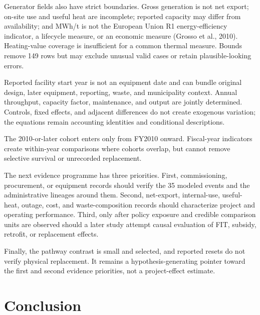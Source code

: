 \documentclass[12pt,letterpaper]{article}
\begin{document}
Generator fields also have strict boundaries. Gross generation is not net
export; on-site use and useful heat are incomplete; reported capacity may differ
from availability; and MWh/t is not the European Union R1 energy-efficiency
indicator, a lifecycle measure, or an economic measure (Grosso et al., 2010).
Heating-value coverage is insufficient for a common thermal measure. Bounds
remove 149 rows but may exclude unusual valid cases or retain plausible-looking
errors.

Reported facility start year is not an equipment date and can bundle original
design, later equipment, reporting, waste, and municipality context. Annual throughput,
capacity factor, maintenance, and output are jointly determined. Controls,
fixed effects, and adjacent differences do not create exogenous variation; the
equations remain accounting identities and conditional descriptions.

The 2010-or-later cohort enters only from FY2010 onward. Fiscal-year indicators
create within-year comparisons where cohorts overlap, but cannot remove
selective survival or unrecorded replacement.

The next evidence programme has three priorities. First, commissioning,
procurement, or equipment records should verify the 35 modeled events and the
administrative lineages around them. Second, net-export, internal-use, useful-
heat, outage, cost, and waste-composition records should characterize project
and operating performance. Third, only after policy exposure and credible
comparison units are observed should a later study attempt causal evaluation of
FIT, subsidy, retrofit, or replacement effects.

Finally, the pathway contrast is small and selected, and reported resets do not
verify physical replacement. It remains a hypothesis-generating pointer toward
the first and second evidence priorities, not a project-effect estimate.

\section{Conclusion}
\end{document}

